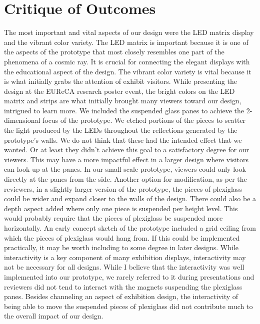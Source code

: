 \documentclass{article}
\begin{document}
\section{Critique of Outcomes}
The most important and vital aspects of our design were the LED matrix display and the vibrant color variety. The LED matrix is important because it is one of the aspects of the prototype that most closely resembles one part of the phenomena of a cosmic ray. It is crucial for connecting the elegant displays with the educational aspect of the design. The vibrant color variety is vital because it is what initially grabs the attention of exhibit visitors. While presenting the design at the EUReCA research poster event, the bright colors on the LED matrix and strips are what initially brought many viewers toward our design, intrigued to learn more. 
We included the suspended glass panes to achieve the 2-dimensional focus of the prototype. We etched portions of the pieces to scatter the light produced by the LEDs throughout the reflections generated by the prototype’s walls. We do not think that these had the intended effect that we wanted. Or at least they didn’t achieve this goal to a satisfactory degree for our viewers. This may have a more impactful effect in a larger design where visitors can look up at the panes. In our small-scale prototype, viewers could only look directly at the panes from the side. Another option for modification, as per the reviewers, in a slightly larger version of the prototype, the pieces of plexiglass could be wider and expand closer to the walls of the design. There could also be a depth aspect added where only one piece is suspended per height level. This would probably require that the pieces of plexiglass be suspended more horizontally. An early concept sketch of the prototype included a grid ceiling from which the pieces of plexiglass would hang from. If this could be implemented practically, it may be worth including to some degree in later designs.
While interactivity is a key component of many exhibition displays, interactivity may not be necessary for all designs. While I believe that the interactivity was well implemented into our prototype, we rarely referred to it during presentations and reviewers did not tend to interact with the magnets suspending the plexiglass panes. Besides channeling an aspect of exhibition design, the interactivity of being able to move the suspended pieces of plexiglass did not contribute much to the overall impact of our design.

\newpage
\end{document}
